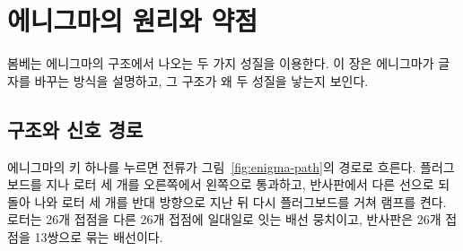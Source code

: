\chapter{에니그마의 원리와 약점}\label{ch:enigma}

봄베는 에니그마의 구조에서 나오는 두 가지 성질을 이용한다. 이 장은 에니그마가 글자를 바꾸는 방식을
설명하고, 그 구조가 왜 두 성질을 낳는지 보인다.

\section{구조와 신호 경로}

에니그마의 키 하나를 누르면 전류가 그림~\ref{fig:enigma-path}의 경로로 흐른다. 플러그보드를 지나
로터 세 개를 오른쪽에서 왼쪽으로 통과하고, 반사판에서 다른 선으로 되돌아 나와 로터 세 개를 반대
방향으로 지난 뒤 다시 플러그보드를 거쳐 램프를 켠다. 로터는 26개 접점을 다른 26개 접점에 일대일로
잇는 배선 뭉치이고, 반사판은 26개 접점을 13쌍으로 묶는 배선이다.

